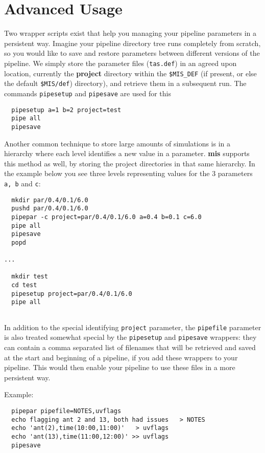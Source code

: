 \documentclass[preprint]{aastex} %
\begin{document}
\section{Advanced Usage}

Two wrapper scripts exist that help you managing your pipeline
parameters in a persistent way. Imagine your pipeline directory tree
runs completely from scratch, so you would like to save and restore
parameters between different versions of the pipeline. We simply store
the parameter files ({\tt tas.def}) in an agreed upon location,
currently the {\bf project} directory within the {\tt \$MIS\_DEF}
(if present, or else the default {\tt \$MIS/def}) directory), and
retrieve them in a subsequent run. The commands {\tt pipesetup} and
{\tt pipesave} are used for this
\footnotesize
\begin{verbatim}
  pipesetup a=1 b=2 project=test
  pipe all
  pipesave
\end{verbatim}
\normalsize   

Another common technique to store large amounts of simulations
is in a hierarchy where each level identifies a new value in a
parameter. {\bf mis} supports this method as well, by
storing the project directories in that same hierarchy. 
In the example below you see three levels representing values for the
3 parameters {\tt a, b} and {\tt c}:

\footnotesize
\begin{verbatim}
  mkdir par/0.4/0.1/6.0
  pushd par/0.4/0.1/6.0
  pipepar -c project=par/0.4/0.1/6.0 a=0.4 b=0.1 c=6.0
  pipe all
  pipesave
  popd 

...

  mkdir test
  cd test
  pipesetup project=par/0.4/0.1/6.0
  pipe all
  
\end{verbatim}
\normalsize   

In addition to the special identifying {\tt project} parameter, 
the {\tt pipefile} parameter is also treated somewhat special by the
{\tt pipesetup} and {\tt pipesave} wrappers: they can contain a comma
separated list of filenames that will be retrieved and saved at the start
and beginning of a pipeline, if you add these wrappers to your pipeline.
This would then enable your pipeline to use these files in a more persistent
way.

Example:
\footnotesize
\begin{verbatim}
  pipepar pipefile=NOTES,uvflags
  echo flagging ant 2 and 13, both had issues   > NOTES
  echo 'ant(2),time(10:00,11:00)'   > uvflags
  echo 'ant(13),time(11:00,12:00)' >> uvflags
  pipesave

\end{verbatim}
\normalsize 
\end{document}
